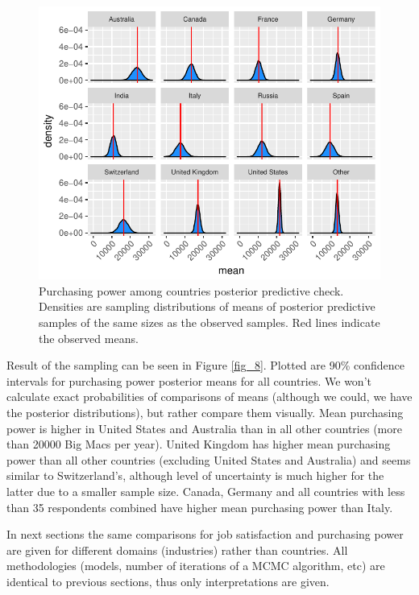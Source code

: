 \documentclass{article}
\begin{document}
\begin{figure}[H]
\centering
\includegraphics{report-027}
\caption{Purchasing power among countries posterior predictive check. Densities are sampling distributions of means of posterior predictive samples of the same sizes as the observed samples. Red lines indicate the observed means.}\label{fig_7}
\end{figure}

Result of the sampling can be seen in Figure \ref{fig_8}. Plotted are 90\% confidence intervals for purchasing power posterior means for all countries. We won't calculate exact probabilities of comparisons of means (although we could, we have the posterior distributions), but rather compare them visually. Mean purchasing power is higher in United States and Australia than in all other countries (more than 20000 Big Macs per year). United Kingdom has higher mean purchasing power than all other countries (excluding United States and Australia) and seems similar to Switzerland's, although level of uncertainty is much higher for the latter due to a smaller sample size. Canada, Germany and all countries with less than 35 respondents combined have higher mean purchasing power than Italy.

In next sections the same comparisons for job satisfaction and purchasing power are given for different domains (industries) rather than countries. All methodologies (models, number of iterations of a MCMC algorithm, etc) are identical to previous sections, thus only interpretations are given.
\end{document}
